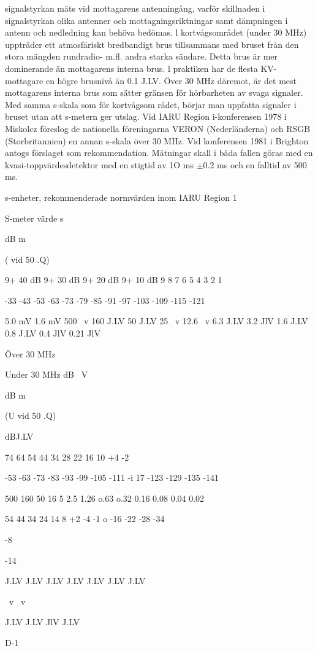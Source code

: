 \documentclass[a4paper,twoside,twocolumn,openright]{book}
\begin{document}
{{{{{{{{{{{{{signalstyrkan mäts vid mottagarens antenningång, varför skillnaden i signalstyrkan
olika antenner och mottagningsriktningar samt dämpningen i antenn och nedledning kan behöva bedömas.
l kortvågsområdet (under 30 MHz) uppträder ett atmosfäriskt bredbandigt brus tillsammans med bruset från den stora mängden rundradio- m.fl. andra starka sändare.
Detta brus är mer dominerande än mottagarens interna brus. l praktiken har de flesta
KV-mottagare en högre brusnivå än 0.1 J.LV.
Över 30 MHz däremot, är det mest mottagarens interna brus som sätter gränsen för
hörbarheten av svaga signaler. Med samma
s-skala som för kortvågsom rådet, börjar man
uppfatta signaler i bruset utan att s-metern
ger utslag.
Vid IARU Region i-konferensen 1978 i
Miskolcz föreslog de nationella föreningarna
VERON (Nederländerna) och RSGB (Storbritannien) en annan s-skala över 30 MHz.
Vid konferensen 1981 i Brighton antogs förslaget som rekommendation.
Mätningar skall i båda fallen göras med
en kvasi-toppvärdesdetektor med en stigtid
av 1O ms $\pm$0.2 ms och en falltid av 500 ms.

s-enheter, rekommenderade normvärden inom IARU Region 1

S-meter
värde
s

dB m

( vid 50 .Q)

9+ 40 dB
9+ 30 dB
9+ 20 dB
9+ 10 dB
9
8
7
6
5
4
3
2
1

-33
-43
-53
-63
-73
-79
-85
-91
-97
-103
-109
-115
-121

5.0 mV
1.6 mV
500
~v
160
J.LV
50
J.LV
25
~v
12.6 ~v
6.3 J.LV
3.2 JlV
1.6 J.LV
0.8 J.LV
0.4 JlV
0.21 JlV

Över 30 MHz

Under 30 MHz
dB~ V

dB m

(U vid 50 .Q)

dBJ.LV

74
64
54
44
34
28
22
16
10
+4
-2

-53
-63
-73
-83
-93
-99
-105
-111
-i 17
-123
-129
-135
-141

500
160
50
16
5
2.5
1.26
o.63
o.32
0.16
0.08
0.04
0.02

54
44
34
24
14
8
+2
-4
-1 o
-16
-22
-28
-34

-8

-14

J.LV
J.LV
J.LV
J.LV
J.LV
J.LV
J.LV

~v
~v

J.LV
J.LV
JlV
J.LV

D-1

}}}}}}}}}}}}}
\end{document}
